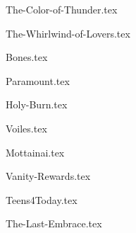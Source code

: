 \begin{songs}{}

  {The-Color-of-Thunder.tex}

  {The-Whirlwind-of-Lovers.tex}
  \sclearpage

  {Bones.tex}
  \sclearpage

  {Paramount.tex}

  {Holy-Burn.tex}
  \sclearpage

  {Voiles.tex}

  {Mottainai.tex}

  {Vanity-Rewards.tex}

  {Teens4Today.tex}
  \sclearpage

  {The-Last-Embrace.tex}
  \sclearpage


\end{songs}
